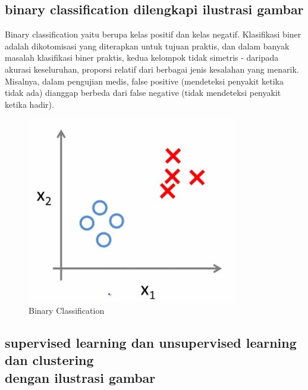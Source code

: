 \subsection{binary classification dilengkapi ilustrasi gambar}

\par Binary classification yaitu berupa kelas positif dan kelas negatif. Klasifikasi biner adalah dikotomisasi yang diterapkan untuk tujuan praktis, dan dalam banyak masalah klasifikasi biner praktis, kedua kelompok tidak simetris - daripada akurasi keseluruhan, proporsi relatif dari berbagai jenis kesalahan yang menarik. Misalnya, dalam pengujian medis, false positive (mendeteksi penyakit ketika tidak ada) dianggap berbeda dari false negative (tidak mendeteksi penyakit ketika hadir).

\begin{figure}[ht]
\centering
\includegraphics[scale=0.5]{figures/f1.jpg}
\caption{Binary Classification}
\label{contoh}
\end{figure}

\subsection{supervised learning dan unsupervised learning dan clustering\\ dengan ilustrasi gambar}


